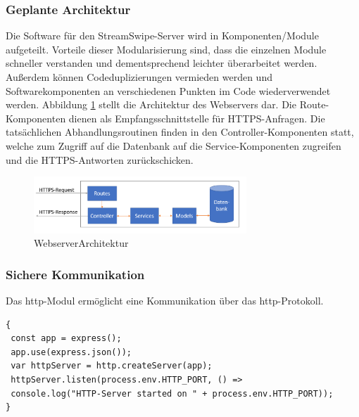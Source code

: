 \subsubsection{Geplante Architektur}
Die Software für den StreamSwipe-Server wird in Komponenten/Module aufgeteilt. Vorteile dieser Modularisierung sind, dass die einzelnen Module schneller verstanden und dementsprechend leichter überarbeitet werden. Außerdem können Codeduplizierungen vermieden werden und Softwarekomponenten an verschiedenen Punkten im Code wiederverwendet werden. Abbildung \ref{fig:WebserverArchitektur} stellt die Architektur des Webservers dar. Die Route-Komponenten dienen als Empfangsschnittstelle für HTTPS-Anfragen. Die tatsächlichen Abhandlungsroutinen finden in den Controller-Komponenten statt, welche zum Zugriff auf die Datenbank auf die Service-Komponenten zugreifen und die HTTPS-Antworten zurückschicken.
\begin{figure}[tbt]
\centering
\includegraphics[width=8cm]{images/backendstruktur.PNG}
\caption{WebserverArchitektur}
\label{fig:WebserverArchitektur}
\end{figure}

\subsubsection{Sichere Kommunikation}
\label{sec:SichereKommunikation}
Das http-Modul ermöglicht eine Kommunikation über das http-Protokoll.\\
 
\begin{lstlisting}[caption=Einfache Verbindung, label=lst:nodejs_easyconnection]
{
 const app = express();
 app.use(express.json()); 
 var httpServer = http.createServer(app);
 httpServer.listen(process.env.HTTP_PORT, () => 
 console.log("HTTP-Server started on " + process.env.HTTP_PORT));
}
\end{lstlisting}

